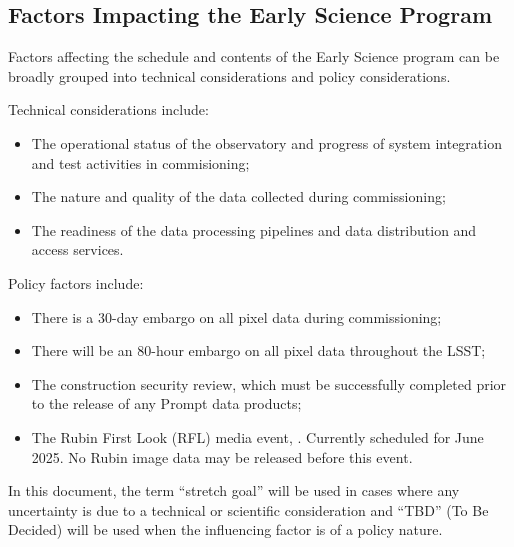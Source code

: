 \subsection{Factors Impacting the Early Science Program }
\label{ssec:impact}

Factors affecting the schedule and contents of the Early Science program can be broadly grouped into technical considerations and policy considerations. 

Technical considerations include:
\begin{itemize}
\item The operational status of the observatory and progress of system integration and test activities in commisioning; 
\item The nature and quality of the data collected during commissioning; 
\item The readiness of the data processing pipelines and data distribution and access services. 
\end{itemize}
Policy factors include:
\begin{itemize}
\item There is a 30-day embargo on all pixel data during commissioning;
\item There will be an 80-hour embargo on all pixel data throughout the LSST; 
\item The construction security review, which must be successfully completed prior to the release of any Prompt data products; 
\item The Rubin First Look (RFL) media event, . Currently scheduled for  June 2025. No Rubin image data may be released before this event. 
\end{itemize}
 
In this document, the term ``stretch goal'' will be used in cases where any uncertainty is due to a technical or scientific consideration and ``TBD'' (To Be Decided) will be used when the influencing factor is of a policy nature. 

